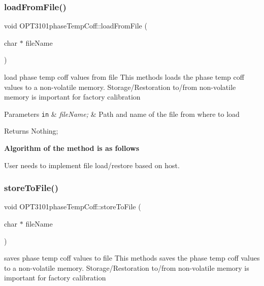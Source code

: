 \subsubsection{\texorpdfstring{load\+From\+File()}{loadFromFile()}}
{\footnotesize\ttfamily void O\+P\+T3101phase\+Temp\+Coff\+::load\+From\+File (\begin{DoxyParamCaption}\item[{char $\ast$}]{file\+Name }\end{DoxyParamCaption})}



load phase temp coff values from file This methods loads the phase temp coff values to a non-\/volatile memory. Storage/\+Restoration to/from non-\/volatile memory is important for factory calibration 


\begin{DoxyParams}[1]{Parameters}
\mbox{\tt in}  & {\em file\+Name;} & Path and name of the file from where to load \\
\hline
\end{DoxyParams}
\begin{DoxyReturn}{Returns}
Nothing; 
\end{DoxyReturn}
{\bfseries Algorithm of the method is as follows}
\begin{DoxyItemize}
\item User needs to implement file load/restore based on host. 
\end{DoxyItemize}\mbox{\label{class_o_p_t3101phase_temp_coff_a761f66319ee3381cf1a347414f9dce52}} 
\subsubsection{\texorpdfstring{store\+To\+File()}{storeToFile()}}
{\footnotesize\ttfamily void O\+P\+T3101phase\+Temp\+Coff\+::store\+To\+File (\begin{DoxyParamCaption}\item[{char $\ast$}]{file\+Name }\end{DoxyParamCaption})}



saves phase temp coff values to file This methods saves the phase temp coff values to a non-\/volatile memory. Storage/\+Restoration to/from non-\/volatile memory is important for factory calibration 


